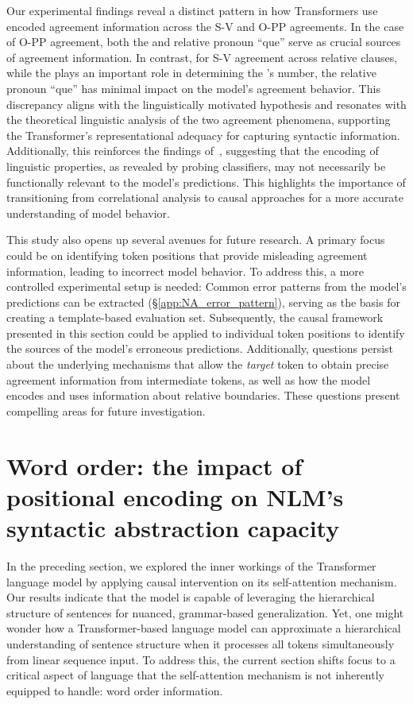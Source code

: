 Our experimental findings reveal a distinct pattern in how Transformers use encoded agreement information across the S-V and O-PP agreements. In the case of O-PP agreement, both the \cue and relative pronoun ``que'' serve as crucial sources of agreement information. In contrast, for S-V agreement across relative clauses, while the \cue 
plays an important role in determining the \target's number, the relative pronoun ``que'' has minimal impact on the model's agreement behavior. This discrepancy aligns with the linguistically motivated hypothesis and resonates with the theoretical linguistic analysis of the two agreement phenomena, supporting the Transformer's representational adequacy for capturing syntactic information. Additionally, this reinforces the findings of~\cite{elazar2021amnesic, hanna-etal-2023-functional}, suggesting that the encoding of linguistic properties, as revealed by probing classifiers, may not necessarily be functionally relevant to the model's predictions. This highlights the importance of transitioning from correlational analysis to causal approaches for a more accurate understanding of model behavior. 

This study also opens up several avenues for future research. A primary focus could be on identifying token positions that provide misleading agreement information, leading to incorrect model behavior. To address this, a more controlled experimental setup is needed: Common error patterns from the model's predictions can be extracted (\S\ref{app:NA_error_pattern}), serving as the basis for creating a template-based evaluation set. Subsequently, the causal framework presented in this section could be applied to individual token positions to identify the sources of the model's erroneous predictions. Additionally, questions persist about the underlying mechanisms that allow the \textit{target} token to obtain precise agreement information from intermediate tokens, as well as how the model encodes and uses information about relative boundaries. These questions present compelling areas for future investigation.


\section{Word order: the impact of positional encoding on NLM's syntactic abstraction capacity } \label{sec:word_order_NA}

In the preceding section, we explored the inner workings of the Transformer language model by applying causal intervention on its self-attention mechanism. Our results indicate that the model is capable of leveraging the hierarchical structure of sentences for nuanced, grammar-based generalization. Yet, one might wonder how a Transformer-based language model can approximate a hierarchical understanding of sentence structure when it processes all tokens simultaneously from linear sequence input. To address this, the current section shifts focus to a critical aspect of language that the self-attention mechanism is not inherently equipped to handle: word order information.


